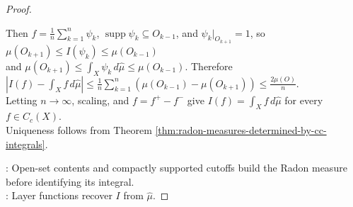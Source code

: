 \begin{theorem}
\begin{proof}
\begin{enumerate}[label=(\roman*)]
Then $f=\frac{1}{n}\sum\limits_{k=1}^n\psi_k$, $\operatorname{supp}\psi_k\subseteq O_{k-1}$, and $\psi_k|_{O_{k+1}}=1$, so $\mu(O_{k+1})\leq I(\psi_k)\leq\mu(O_{k-1})$\\
and $\mu(O_{k+1})\leq\int_X\psi_k\,d\widehat{\mu}\leq\mu(O_{k-1})$. Therefore $|I(f)-\int_X f\,d\widehat{\mu}|\leq\frac{1}{n}\sum\limits_{k=1}^n(\mu(O_{k-1})-\mu(O_{k+1}))\leq\frac{2\mu(O)}{n}$.\\
Letting $n\to\infty$, scaling, and $f=f^+-f^-$ give $I(f)=\int_X f\,d\widehat{\mu}$ for every $f\in C_c(X)$.\\
Uniqueness follows from Theorem \ref{thm:radon-measures-determined-by-cc-integrals}.
\end{enumerate}
: Open-set contents and compactly supported cutoffs build the Radon measure before identifying its integral.\\
: Layer functions recover $I$ from $\widehat{\mu}$.
\end{proof}
\end{theorem}

